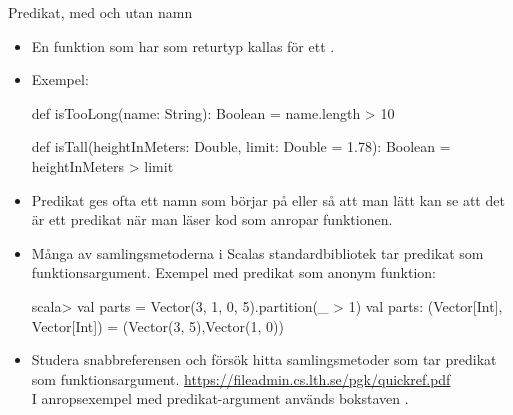 \begin{Slide}{Predikat, med och utan namn}
\ifkompendium \ExplainPredicate \fi 
\begin{itemize}\SlideFontTiny
\ifkompendium\else
\item En funktion som har  som returtyp kallas för ett . 
\fi
\item Exempel:
\begin{Code}
def isTooLong(name: String): Boolean = name.length > 10

def isTall(heightInMeters: Double, limit: Double = 1.78): Boolean = 
  heightInMeters > limit
\end{Code}
\item Predikat ges ofta ett namn som börjar på  eller  så att man lätt kan se att det är ett predikat när man läser kod som anropar funktionen.
\item Många av samlingsmetoderna i Scalas standardbibliotek tar predikat som funktionsargument. Exempel med predikat som anonym funktion: 
\begin{REPLnonum}
scala> val parts = Vector(3, 1, 0, 5).partition(_ > 1)
val parts: (Vector[Int], Vector[Int]) = 
  (Vector(3, 5),Vector(1, 0))
\end{REPLnonum} 
\item Studera snabbreferensen och försök hitta samlingsmetoder som tar predikat som funktionsargument. \url{https://fileadmin.cs.lth.se/pgk/quickref.pdf} \\I anropsexempel med predikat-argument används bokstaven .
\end{itemize}  
\end{Slide}

